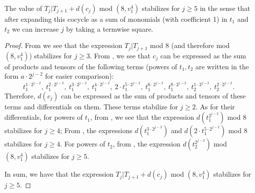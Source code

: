 \begin{lem}\label{lem:cobar-stabilize}
  The value of $T_j|T_{j+1} + d(c_j)$ mod $(8,v_1^4)$ stabilizes for $j \geq 5$ in the sense that after expanding this cocycle as a sum of monomials (with coefficient 1) in $t_1$ and $t_2$ we can increase $j$ by taking a termwise square. 
\end{lem}

\begin{proof}
From  we see that the expression $T_j|T_{j+1}$ mod 8 (and therefore mod $(8,v_1^4)$) stabilizes for $j \geq 3$. From , we see that $c_j$ can be expressed as the sum of products and tensors of the following terms (powers of $t_1,t_2$ are written in the form $a \cdot 2^{j-2}$ for easier comparison):
\[ {t_1^{1 \cdot 2^{j-2}}},\ t_1^{2 \cdot 2^{j-2}},\ {t_1^{3 \cdot 2^{j-2}}},\ t_1^{4 \cdot 2^{j-2}},\ 2 \cdot {t_1^{5 \cdot 2^{j-2}}},\ t_1^{6 \cdot 2^{j-2}},\ {t_1^{8 \cdot 2^{j-2}}},\ {t_2^{1 \cdot 2^{j-2}}},\ t_2^{2 \cdot 2^{j-2}}. \]
Therefore, $d(c_j)$ can be expressed as the sum of products and tensors of these terms and differentials on them. These terms stabilize for $j \geq 2$. As for their differentials,
for powers of $t_1$, from , we see that the expression $d(t_1^{2^{j-2}})$ mod 8 stabilizes for $j \geq 4$; 
  From , the expressions $d(t_1^{3 \cdot 2^{j-2}})$ and $d(2 \cdot t_1^{5 \cdot 2^{j-2}})$ mod 8 stabilizes for $j \geq 4$.  
  For powers of $t_2$, from , the expression $d(t_2^{2^{j-2}})$ mod $(8, v_1^4)$ stabilizes for $j \geq 5$. 
 
  In sum, we have that the expression $T_j|T_{j+1} + d(c_j)$ mod $(8,v_1^4)$ stabilizes for $j \geq 5$.
 
\end{proof}

